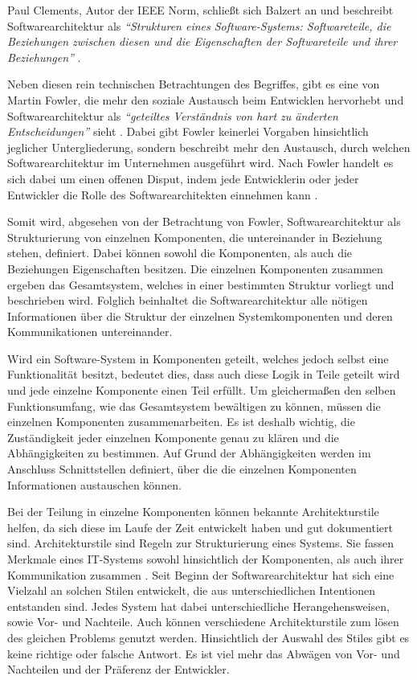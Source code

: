 Paul Clements, Autor der IEEE Norm, schließt sich Balzert an und beschreibt Softwarearchitektur als \textit{\enquote{Strukturen eines Software-Systems: Softwareteile, die Beziehungen zwischen diesen und die Eigenschaften der Softwareteile und ihrer Beziehungen}} \parencite[][S. 23]{clements_documenting_2010}.

Neben diesen rein technischen Betrachtungen des Begriffes, gibt es eine von Martin Fowler, die mehr den soziale Austausch beim Entwicklen hervorhebt und Softwarearchitektur als  \textit{\enquote{geteiltes Verständnis von hart zu änderten Entscheidungen}} sieht \parencite[][S. 3]{fowler_who_2003}. Dabei gibt Fowler keinerlei Vorgaben hinsichtlich jeglicher Untergliederung, sondern beschreibt mehr den Austausch, durch welchen Softwarearchitektur im Unternehmen ausgeführt wird. Nach Fowler handelt es sich dabei um einen offenen Disput, indem jede Entwicklerin oder jeder Entwickler die Rolle des Softwarearchitekten einnehmen kann \parencite[][S. 3 f.]{fowler_who_2003}.

Somit wird, abgesehen von der Betrachtung von Fowler, Softwarearchitektur als Strukturierung von einzelnen Komponenten, die untereinander in Beziehung stehen, definiert. Dabei können sowohl die Komponenten, als auch die Beziehungen Eigenschaften besitzen. Die einzelnen Komponenten zusammen ergeben das Gesamtsystem, welches in einer bestimmten Struktur vorliegt und beschrieben wird. Folglich beinhaltet die Softwarearchitektur alle nötigen Informationen über die Struktur der einzelnen Systemkomponenten und deren Kommunikationen untereinander.

Wird ein Software-System in Komponenten geteilt, welches jedoch selbst eine Funktionalität besitzt, bedeutet dies, dass auch diese Logik in Teile geteilt wird und jede einzelne Komponente einen Teil erfüllt. Um gleichermaßen den selben Funktionsumfang, wie das Gesamtsystem bewältigen zu können, müssen die einzelnen Komponenten zusammenarbeiten. Es ist deshalb wichtig, die Zuständigkeit jeder einzelnen Komponente genau zu klären und die Abhängigkeiten zu bestimmen. Auf Grund der Abhängigkeiten werden im Anschluss Schnittstellen definiert, über die die einzelnen Komponenten Informationen austauschen können.

Bei der Teilung in einzelne Komponenten können bekannte Architekturstile helfen, da sich diese im Laufe der Zeit entwickelt haben und gut dokumentiert sind. Architekturstile sind Regeln zur Strukturierung eines Systems. Sie fassen Merkmale eines IT-Systems sowohl hinsichtlich der Komponenten, als auch ihrer Kommunikation zusammen \parencite[vgl.][S. 102]{starke_effektive_2015}. Seit Beginn der Softwarearchitektur hat sich eine Vielzahl an solchen Stilen entwickelt, die aus unterschiedlichen Intentionen entstanden sind. Jedes System hat dabei unterschiedliche Herangehensweisen, sowie Vor- und Nachteile. 
Auch können verschiedene Architekturstile zum lösen des gleichen Problems genutzt werden. Hinsichtlich der Auswahl des Stiles gibt es keine richtige oder falsche Antwort. Es ist viel mehr das Abwägen von Vor- und Nachteilen und der Präferenz der Entwickler.


